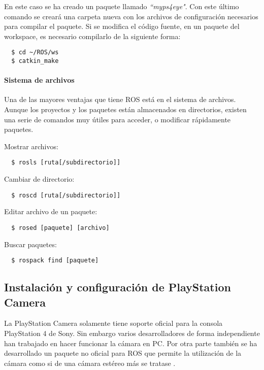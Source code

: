 En este caso se ha creado un paquete llamado \textit{``myps4eye"}. Con este
último comando se creará una carpeta nueva con los archivos de configuración
necesarios para compilar el paquete. Si se modifica el código fuente, en un
paquete del workspace, es necesario compilarlo de la siguiente forma:
\\
\begin{lstlisting}
  $ cd ~/ROS/ws
  $ catkin_make
\end{lstlisting}

\paragraph{Sistema de archivos} \hspace{0pt}

Una de las mayores ventajas que tiene ROS está en el sistema de archivos. Aunque
los proyectos y los paquetes están almacenados en directorios, existen una serie
de comandos muy útiles para acceder, o modificar rápidamente paquetes.

Mostrar archivos:
\\
\begin{lstlisting}
  $ rosls [ruta[/subdirectorio]]
\end{lstlisting}

Cambiar de directorio:
\\
\begin{lstlisting}
  $ roscd [ruta[/subdirectorio]]
\end{lstlisting}

Editar archivo de un paquete:
\\
\begin{lstlisting}
  $ rosed [paquete] [archivo]
\end{lstlisting}

Buscar paquetes:
\\
\begin{lstlisting}
  $ rospack find [paquete]
\end{lstlisting}

\subsection{Instalación y configuración de PlayStation Camera}
La PlayStation Camera solamente tiene soporte oficial para la consola
PlayStation 4 de Sony. Sin embargo varios desarrolladores de forma independiente
han trabajado en hacer funcionar la cámara en PC. Por otra parte también se ha
desarrollado un paquete no oficial para ROS que permite la utilización de la
cámara como si de una cámara estéreo más se tratase \cite{PS4Eye}.

